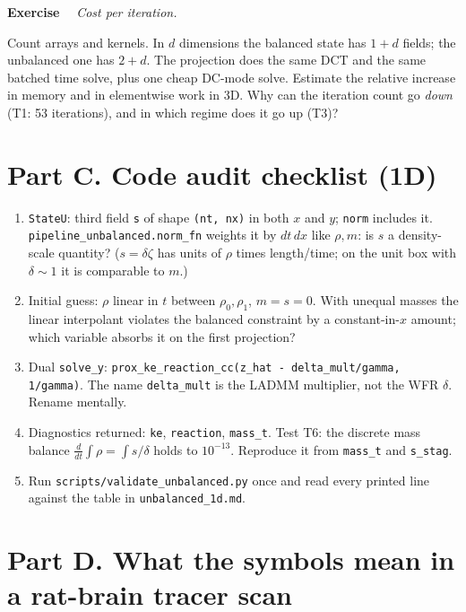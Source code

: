 \documentclass[11pt]{article}
\newcommand{\code}[1]{\texttt{#1}}
\newcounter{ex}
\newenvironment{ex}[1]{\refstepcounter{ex}\par\medskip\noindent\textbf{Exercise \theex}\ \ \textit{#1}\par\nopagebreak\smallskip}{\par\medskip}
\begin{document}
\begin{ex}{Cost per iteration.}
Count arrays and kernels. In $d$ dimensions the balanced state has $1+d$ fields; the
unbalanced one has $2+d$. The projection does the same DCT and the same batched time solve,
plus one cheap DC-mode solve. Estimate the relative increase in memory and in elementwise
work in 3D. Why can the iteration count go \emph{down} (T1: 53 iterations), and in which
regime does it go up (T3)?
\end{ex}

\section*{Part C. Code audit checklist (1D)}

\begin{enumerate}
  \item \code{StateU}: third field \code{s} of shape \code{(nt, nx)} in both $x$ and $y$;
        \code{norm} includes it. \code{pipeline\_unbalanced.norm\_fn} weights it by
        $dt\,dx$ like $\rho,m$: is $s$ a density-scale quantity? ($s=\delta\zeta$ has units of
        $\rho$ times length/time; on the unit box with $\delta\sim1$ it is comparable to $m$.)
  \item Initial guess: $\rho$ linear in $t$ between $\rho_0,\rho_1$, $m=s=0$. With unequal
        masses the linear interpolant violates the balanced constraint by a constant-in-$x$
        amount; which variable absorbs it on the first projection?
  \item Dual \code{solve\_y}: \code{prox\_ke\_reaction\_cc(z\_hat - delta\_mult/gamma, 1/gamma)}.
        The name \code{delta\_mult} is the LADMM multiplier, not the WFR $\delta$. Rename
        mentally.
  \item Diagnostics returned: \code{ke}, \code{reaction}, \code{mass\_t}. Test T6: the
        discrete mass balance $\tfrac{d}{dt}\int\rho=\int s/\delta$ holds to $10^{-13}$.
        Reproduce it from \code{mass\_t} and \code{s\_stag}.
  \item Run \code{scripts/validate\_unbalanced.py} once and read every printed line against
        the table in \code{unbalanced\_1d.md}.
\end{enumerate}

\section*{Part D. What the symbols mean in a rat-brain tracer scan}
\end{document}
